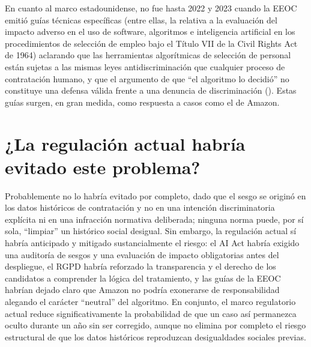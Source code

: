 En cuanto al marco estadounidense, no fue hasta 2022 y 2023 cuando la EEOC emitió guías técnicas específicas (entre ellas, la relativa a la evaluación del impacto adverso en el uso de software, algoritmos e inteligencia artificial en los procedimientos de selección de empleo bajo el Título VII de la Civil Rights Act de 1964) aclarando que las herramientas algorítmicas de selección de personal están sujetas a las mismas leyes antidiscriminación que cualquier proceso de contratación humano, y que el argumento de que ``el algoritmo lo decidió'' no constituye una defensa válida frente a una denuncia de discriminación (\textcite{eeoc2023}). Estas guías surgen, en gran medida, como respuesta a casos como el de Amazon.

\section{¿La regulación actual habría evitado este problema?}
Probablemente no lo habría evitado por completo, dado que el sesgo se originó en los datos históricos de contratación y no en una intención discriminatoria explícita ni en una infracción normativa deliberada; ninguna norma puede, por sí sola, ``limpiar'' un histórico social desigual. Sin embargo, la regulación actual sí habría anticipado y mitigado sustancialmente el riesgo: el AI Act habría exigido una auditoría de sesgos y una evaluación de impacto obligatorias antes del despliegue, el RGPD habría reforzado la transparencia y el derecho de los candidatos a comprender la lógica del tratamiento, y las guías de la EEOC habrían dejado claro que Amazon no podría exonerarse de responsabilidad alegando el carácter ``neutral'' del algoritmo. En conjunto, el marco regulatorio actual reduce significativamente la probabilidad de que un caso así permanezca oculto durante un año sin ser corregido, aunque no elimina por completo el riesgo estructural de que los datos históricos reproduzcan desigualdades sociales previas.
